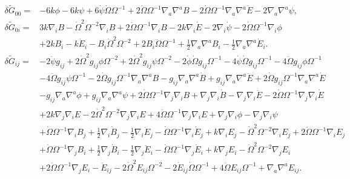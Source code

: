 \documentclass[10pt,letterpaper]{article}
\numberwithin{equation}{subsection}
\begin{document}
\begin{align}
\delta \tilde G_{00}={}&-6 k \phi
 - 6 k \psi
 + 6 \dot{\psi} \dot{\Omega} \Omega^{-1}
 + 2 \dot{\Omega} \Omega^{-1} \nabla_{a}\nabla^{a}B
 - 2 \dot{\Omega} \Omega^{-1} \nabla_{a}\nabla^{a}\dot{E}
 - 2 \nabla_{a}\nabla^{a}\psi,
\nonumber\\
\delta \tilde G_{0i}={}&3 k \nabla_{i}B
 -  \dot{\Omega}^2 \Omega^{-2} \nabla_{i}B
 + 2 \ddot{\Omega} \Omega^{-1} \nabla_{i}B
 - 2 k \nabla_{i}\dot{E}
 - 2 \nabla_{i}\dot{\psi}
 - 2 \dot{\Omega} \Omega^{-1} \nabla_{i}\phi
\nonumber\\
&+2 k B_{i}
 -  k \dot{E}_{i}
 -  B_{i} \dot{\Omega}^2 \Omega^{-2}
 + 2 B_{i} \ddot{\Omega} \Omega^{-1}
 + \tfrac{1}{2} \nabla_{a}\nabla^{a}B_{i}
 -  \tfrac{1}{2} \nabla_{a}\nabla^{a}\dot{E}_{i}.
\nonumber\\
\delta \tilde G_{ij}={}&-2 \ddot{\psi} g_{ij}
 + 2 \dot{\Omega}^2 g_{ij} \phi \Omega^{-2}
 + 2 \dot{\Omega}^2 g_{ij} \psi \Omega^{-2}
 - 2 \dot{\phi} \dot{\Omega} g_{ij} \Omega^{-1}
 - 4 \dot{\psi} \dot{\Omega} g_{ij} \Omega^{-1}
 - 4 \ddot{\Omega} g_{ij} \phi \Omega^{-1}\nonumber\\
& - 4 \ddot{\Omega} g_{ij} \psi \Omega^{-1}
 - 2 \dot{\Omega} g_{ij} \Omega^{-1} \nabla_{a}\nabla^{a}B
 -  g_{ij} \nabla_{a}\nabla^{a}\dot{B}
 + g_{ij} \nabla_{a}\nabla^{a}\ddot{E}
 + 2 \dot{\Omega} g_{ij} \Omega^{-1} \nabla_{a}\nabla^{a}\dot{E}\nonumber\\
& -  g_{ij} \nabla_{a}\nabla^{a}\phi
 + g_{ij} \nabla_{a}\nabla^{a}\psi
 + 2 \dot{\Omega} \Omega^{-1} \nabla_{j}\nabla_{i}B
 + \nabla_{j}\nabla_{i}\dot{B}
 -  \nabla_{j}\nabla_{i}\ddot{E}
 - 2 \dot{\Omega} \Omega^{-1} \nabla_{j}\nabla_{i}\dot{E}\nonumber\\
& + 2 k \nabla_{j}\nabla_{i}E
 - 2 \dot{\Omega}^2 \Omega^{-2} \nabla_{j}\nabla_{i}E
 + 4 \ddot{\Omega} \Omega^{-1} \nabla_{j}\nabla_{i}E
 + \nabla_{j}\nabla_{i}\phi
 -  \nabla_{j}\nabla_{i}\psi
\nonumber\\
& +\dot{\Omega} \Omega^{-1} \nabla_{i}B_{j}
 + \tfrac{1}{2} \nabla_{i}\dot{B}_{j}
 -  \tfrac{1}{2} \nabla_{i}\ddot{E}_{j}
 -  \dot{\Omega} \Omega^{-1} \nabla_{i}\dot{E}_{j}
 + k \nabla_{i}E_{j}
 -  \dot{\Omega}^2 \Omega^{-2} \nabla_{i}E_{j}
 + 2 \ddot{\Omega} \Omega^{-1} \nabla_{i}E_{j}\nonumber\\
& + \dot{\Omega} \Omega^{-1} \nabla_{j}B_{i}
 + \tfrac{1}{2} \nabla_{j}\dot{B}_{i}
 -  \tfrac{1}{2} \nabla_{j}\ddot{E}_{i}
 -  \dot{\Omega} \Omega^{-1} \nabla_{j}\dot{E}_{i}
 + k \nabla_{j}E_{i}
 -  \dot{\Omega}^2 \Omega^{-2} \nabla_{j}E_{i}\nonumber\\
& + 2 \ddot{\Omega} \Omega^{-1} \nabla_{j}E_{i}
- \ddot{E}_{ij}
 - 2 \dot{\Omega}^2 E_{ij} \Omega^{-2}
 - 2 \dot{E}_{ij} \dot{\Omega} \Omega^{-1}
 + 4 \ddot{\Omega} E_{ij} \Omega^{-1}
 + \nabla_{a}\nabla^{a}E_{ij}.
\end{align}
\end{document}
